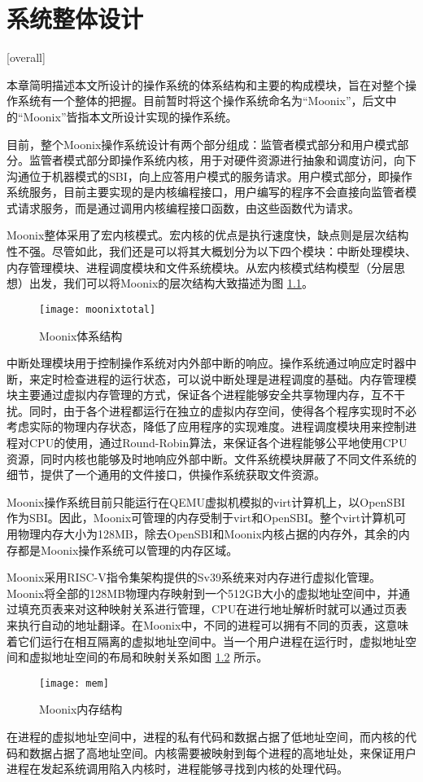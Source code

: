 
\chapter{系统整体设计}[overall]
\label{chapter:overall}

本章简明描述本文所设计的操作系统的体系结构和主要的构成模块，旨在对整个操作系统有一个整体的把握。目前暂时将这个操作系统命名为“Moonix”，后文中的“Moonix”皆指本文所设计实现的操作系统。

目前，整个Moonix操作系统设计有两个部分组成：监管者模式部分和用户模式部分。监管者模式部分即操作系统内核，用于对硬件资源进行抽象和调度访问，向下沟通位于机器模式的SBI，向上应答用户模式的服务请求。用户模式部分，即操作系统服务，目前主要实现的是内核编程接口，用户编写的程序不会直接向监管者模式请求服务，而是通过调用内核编程接口函数，由这些函数代为请求。

Moonix整体采用了宏内核模式。宏内核的优点是执行速度快，缺点则是层次结构性不强。尽管如此，我们还是可以将其大概划分为以下四个模块：中断处理模块、内存管理模块、进程调度模块和文件系统模块。从宏内核模式结构模型（分层思想）出发，我们可以将Moonix的层次结构大致描述为图 \ref{pic:moonixtotal}。

\begin{figure}[htpb]
	\centering
	\texttt{[image: moonixtotal]}
	\setlength{\abovecaptionskip}{2pt}
	\caption{Moonix体系结构}
	\label{pic:moonixtotal}
\end{figure}

中断处理模块用于控制操作系统对内外部中断的响应。操作系统通过响应定时器中断，来定时检查进程的运行状态，可以说中断处理是进程调度的基础。内存管理模块主要通过虚拟内存管理的方式，保证各个进程能够安全共享物理内存，互不干扰。同时，由于各个进程都运行在独立的虚拟内存空间，使得各个程序实现时不必考虑实际的物理内存状态，降低了应用程序的实现难度。进程调度模块用来控制进程对CPU的使用，通过Round-Robin算法\cite{DBLP:journals/eor/RasmussenT08}，来保证各个进程能够公平地使用CPU资源，同时内核也能够及时地响应外部中断。文件系统模块屏蔽了不同文件系统的细节，提供了一个通用的文件接口，供操作系统获取文件资源。

Moonix操作系统目前只能运行在QEMU虚拟机模拟的virt计算机上\cite{qemu/virt}，以OpenSBI作为SBI。因此，Moonix可管理的内存受制于virt和OpenSBI。整个virt计算机可用物理内存大小为128MB，除去OpenSBI和Moonix内核占据的内存外，其余的内存都是Moonix操作系统可以管理的内存区域。

Moonix采用RISC-V指令集架构提供的Sv39系统来对内存进行虚拟化管理。Moonix将全部的128MB物理内存映射到一个512GB大小的虚拟地址空间中，并通过填充页表来对这种映射关系进行管理，CPU在进行地址解析时就可以通过页表来执行自动的地址翻译。在Moonix中，不同的进程可以拥有不同的页表，这意味着它们运行在相互隔离的虚拟地址空间中。当一个用户进程在运行时，虚拟地址空间和虚拟地址空间的布局和映射关系如图 \ref{pic:moonixmem} 所示。

\begin{figure}[htpb]
	\centering
	\texttt{[image: mem]}
	\setlength{\abovecaptionskip}{2pt}
	\caption{Moonix内存结构}
	\label{pic:moonixmem}
\end{figure}

在进程的虚拟地址空间中，进程的私有代码和数据占据了低地址空间，而内核的代码和数据占据了高地址空间。内核需要被映射到每个进程的高地址处，来保证用户进程在发起系统调用陷入内核时，进程能够寻找到内核的处理代码。